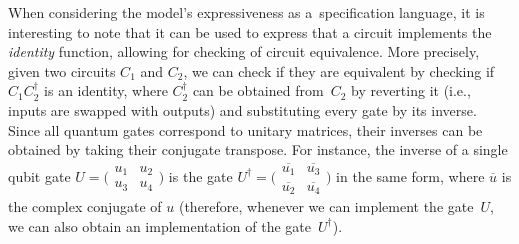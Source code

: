 \figEqVec
When considering the \lsta model's expressiveness as a~specification language, it
is interesting to note that it can be used to express that a circuit implements
the \emph{identity} function, allowing for checking of circuit equivalence.
More precisely, given two circuits $C_1$ and $C_2$, we can check if they are
equivalent by checking if $C_1C_2^\dag$ is an identity, where $C_2^\dag$ can be
obtained from~$C_2$ by reverting it (i.e., inputs are swapped with outputs) and
substituting every gate by its inverse.
Since all quantum gates correspond to unitary matrices, their inverses can be
obtained by taking their conjugate transpose.
For instance,
the inverse of a single qubit gate $U=\big(
\begin{smallmatrix}
u_1 & u_2\\
u_3 & u_4
\end{smallmatrix}\big)$ is the gate $U^\dag = \big(
\begin{smallmatrix}
\overline{u_1} & \overline{u_3} \\
\overline{u_2} & \overline{u_4}
\end{smallmatrix}\big)$
in the same form, where $\overline{u}$ is the complex conjugate of $u$
(therefore, whenever we can implement the gate~$U$, we can also obtain an
implementation of the gate~$U^\dag$).

